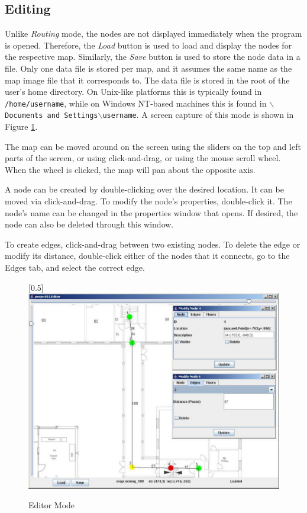 \documentclass[12pt,letterpaper,titlepage]{article}   %
\begin{document}
\subsection{Editing}
Unlike \emph{Routing} mode, the nodes are not displayed immediately when the
program is opened. Therefore, the \emph{Load} button is used to load and
display the nodes for the respective map. Similarly, the \emph{Save} button is
used to store the node data in a file. Only one data file is stored per
map, and it assumes the same name as the map image file that it
corresponds to. The data file is stored in the root of the user's home
directory. On Unix-like platforms this is typically found in
\texttt{/home/username}, while on Windows NT-based machines this is found
in \texttt{$\backslash$Documents and Settings$\backslash$username}. A screen capture of
this mode is shown in Figure \ref{editor-screenshot-1}.

The map can be moved around on the screen using the sliders on the top
and left parts of the screen, or using click-and-drag, or using the
mouse scroll wheel. When the wheel is clicked, the map will pan about
the opposite axis.

A node can be created by double-clicking over the desired location. It
can be moved via click-and-drag. To modify the node's properties,
double-click it. The node's name can be changed in the properties window
that opens. If desired, the node can also be deleted through this
window.

To create edges, click-and-drag between two existing nodes. To delete
the edge or modify its distance, double-click either of the nodes that
it connects, go to the Edges tab, and select the correct edge.
\begin{figure}
\begin{center}
  \scalebox{0.5}[0.5]{\includegraphics{images/pdf/editor-screenshot-1}}
\end{center}
\caption{Editor Mode}
\label{editor-screenshot-1}
\end{figure}
\end{document}
